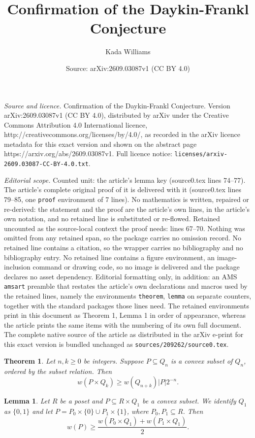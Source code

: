 \documentclass[10pt,a4paper]{amsart}
\title{Confirmation of the Daykin-Frankl Conjecture}
\author{Kada Williams}
\date{Source: arXiv:2609.03087v1 (CC BY 4.0)}
\newtheorem{theorem}{Theorem}
\newtheorem{lemma}{Lemma}
\begin{document}
\maketitle

\noindent\emph{Source and licence.} Confirmation of the Daykin-Frankl Conjecture. Version arXiv:2609.03087v1 (CC BY 4.0), distributed by arXiv under the Creative Commons Attribution 4.0 International licence, http://creativecommons.org/licenses/by/4.0/, as recorded in the arXiv licence metadata for this exact version and shown on the abstract page https://arxiv.org/abs/2609.03087v1. Full licence notice: \texttt{licenses/arxiv-2609.03087-CC-BY-4.0.txt}.\par\smallskip

\noindent\textit{Editorial scope.} Counted unit: the article's lemma key (source0.tex lines 74--77). The article's complete original proof of it is delivered with it (source0.tex lines 79--85, one \texttt{proof} environment of 7 lines). No mathematics is written, repaired or re-derived: the statement and the proof are the article's own lines, in the article's own notation, and no retained line is substituted or re-flowed.  Retained uncounted as the source-local context the proof needs: lines 67--70.  Nothing was omitted from any retained span, so the package carries no omission record.  No retained line contains a citation, so the wrapper carries no bibliography and no bibliography entry.  No retained line contains a figure environment, an image-inclusion command or drawing code, so no image is delivered and the package declares no asset dependency.  Editorial formatting only, in addition: an AMS \texttt{amsart} preamble that restates the article's own declarations and macros used by the retained lines, namely the environments \texttt{theorem}, \texttt{lemma} on separate counters, together with the standard packages those lines need.  The retained environments print in this document as Theorem 1, Lemma 1 in order of appearance, whereas the article prints the same items with the numbering of its own full document.  The complete native source of the article as distributed in the arXiv e-print for this exact version is bundled unchanged as \texttt{sources/209262/source0.tex}.
\begin{theorem} \label{main}
    Let $n,k\ge 0$ be integers. Suppose $P\subseteq Q_n$ is a convex subset of $Q_n$, ordered by the subset relation. Then
    $$w(P\times Q_k)\ge w(Q_{n+k})|P|2^{-n}.$$
\end{theorem}

\begin{lemma} \label{key}
    Let $R$ be a poset and $P\subseteq R\times Q_1$ be a convex subset. We identify $Q_1$ as $\{0,1\}$ and let $P=P_0\times \{0\}\cup P_1\times \{1\}$, where $P_0,P_1\subseteq R$. Then
    $$w(P)\ge \frac{w(P_0\times Q_1)+w(P_1\times Q_1)}{2}.$$
\end{lemma}
\end{document}
